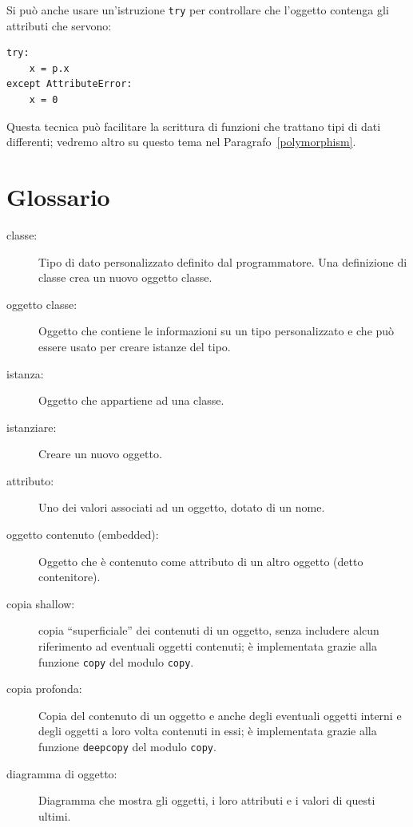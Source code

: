 \documentclass[10pt]{book}
\begin{document}
Si può anche usare un'istruzione {\tt try} per controllare che l'oggetto contenga gli attributi che servono:

\begin{verbatim}
try:
    x = p.x
except AttributeError:
    x = 0
\end{verbatim}

Questa tecnica può facilitare la scrittura di funzioni che trattano tipi di dati differenti; vedremo altro su questo tema nel Paragrafo~\ref{polymorphism}.

\section{Glossario}

\begin{description}

\item[classe:] Tipo di dato personalizzato definito dal programmatore. Una definizione di classe crea un nuovo oggetto classe.

\item[oggetto classe:] Oggetto che contiene le informazioni su un tipo personalizzato e che può essere usato per creare istanze del tipo.

\item[istanza:] Oggetto che appartiene ad una classe.

\item[istanziare:] Creare un nuovo oggetto.

\item[attributo:] Uno dei valori associati ad un oggetto, dotato di un nome.

\item[oggetto contenuto (embedded):] Oggetto che è contenuto come attributo di un altro oggetto (detto contenitore).

\item[copia shallow:] copia ``superficiale'' dei contenuti di un oggetto, senza includere alcun riferimento ad eventuali oggetti contenuti; è implementata grazie alla funzione {\tt copy} del modulo {\tt copy}.

\item[copia profonda:] Copia del contenuto di un oggetto e anche degli eventuali
oggetti interni e degli oggetti a loro volta contenuti in essi; è implementata grazie alla funzione {\tt deepcopy} del modulo {\tt copy}.

\item[diagramma di oggetto:] Diagramma che mostra gli oggetti, i loro attributi e i valori di questi ultimi.

\end{description}
\end{document}
